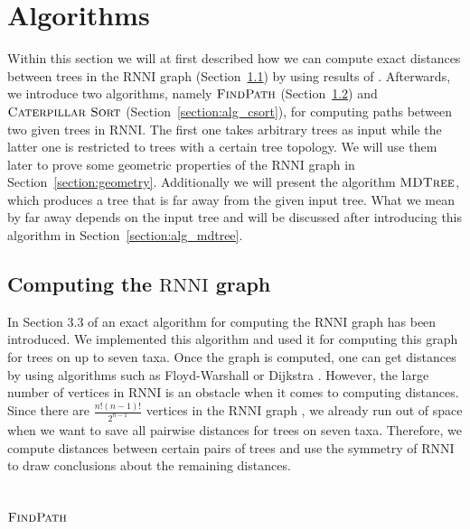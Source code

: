 \documentclass{amsart}
\newcommand{\rnni}{\mathrm{RNNI}}
\newcommand{\csort}{\textsc{Caterpillar Sort}}
\newcommand{\findpath}{\textsc{FindPath}}
\newcommand{\mdtree}{\textsc{MDTree}}
\begin{document}
\section{Algorithms}
\label{section:algorithms}

Within this section we will at first described how we can compute exact distances between trees in the $\rnni$ graph (Section~\ref{section:alg_RNNI_graph}) by using results of \autocite{Gavryushkin2018-ol}.
Afterwards, we introduce two algorithms, namely $\findpath$ (Section~\ref{section:alg_findpath}) and $\csort$ (Section~\ref{section:alg_csort}), for computing paths between two given trees in $\rnni$.
The first one takes arbitrary trees as input while the latter one is restricted to trees with a certain tree topology.
We will use them later to prove some geometric properties of the $\rnni$ graph in Section~\ref{section:geometry}.
Additionally we will present the algorithm $\mdtree$, which produces a tree that is far away from the given input tree.
What we mean by far away depends on the input tree and will be discussed after introducing this algorithm in Section~\ref{section:alg_mdtree}.

\subsection{Computing the $\rnni$ graph}
\label{section:alg_RNNI_graph}

In Section 3.3 of \autocite{Gavryushkin2018-ol} an exact algorithm for computing the $\rnni$ graph has been introduced.
We implemented this algorithm and used it for computing this graph for trees on up to seven taxa.
Once the graph is computed, one can get distances by using algorithms such as Floyd-Warshall \autocite{Floyd1962-ew} or Dijkstra \autocite{Dijkstra1959-ph}.
However, the large number of vertices in $\rnni$ is an obstacle when it comes to computing distances.
Since there are $\frac{n!(n-1)!}{2^{n-1}}$ vertices in the $\rnni$ graph \autocite{Gavryushkin2018-ol}, we already run out of space when we want to save all pairwise distances for trees on seven taxa.
Therefore, we compute distances between certain pairs of trees and use the symmetry of $\rnni$ to draw conclusions about the remaining distances.


\subsection{$\findpath$}
\label{section:alg_findpath}
\end{document}
